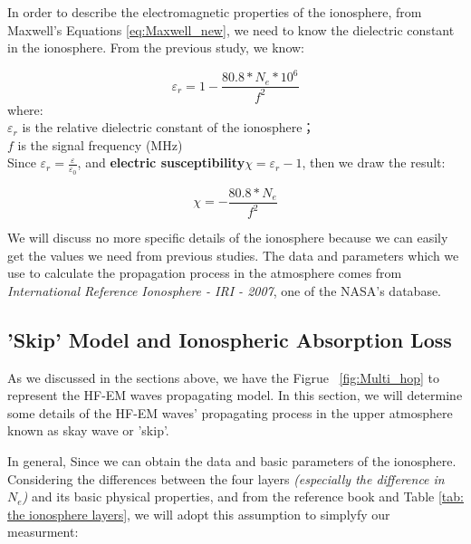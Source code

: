 \documentclass{mcmthesis}
\begin{document}
    In order to describe the electromagnetic properties of the ionosphere, from Maxwell's Equations \ref{eq:Maxwell_new}, we need to know the dielectric constant in the ionosphere. From the previous study\cite{davies1990ionospheric}, we know:

      \begin{equation}\label{eq:relative_dielectric}
        \varepsilon_{r} = 1 - \frac{80.8 * N_{e} * 10^{6}}{f^{2}}
      \end{equation}
      where:\\
      $\varepsilon_{r}$ is the relative dielectric constant of the ionosphere；\\
      $f$ is the signal frequency (MHz) \\

    Since $\varepsilon_{r} = \frac{\varepsilon}{\varepsilon_{0}}$, and \textbf{electric susceptibility}$\chi = \varepsilon_{r} - 1$, then we draw the result:

      \begin{equation}\label{eq:chi}
        \chi = - \frac{80.8 * N_{e}}{f^{2}}
      \end{equation}




    We will discuss no more specific details of the ionosphere because we can easily get the values we need from previous studies. The data and parameters which we use to calculate the propagation process in the atmosphere comes from \emph{International Reference Ionosphere - IRI - 2007}\cite{NASAIonosphere}, one of the NASA's database.


  \subsection{'Skip' Model and Ionospheric Absorption Loss}

    As we discussed in the sections above, we have the Figrue ~\ref{fig:Multi_hop} to represent the HF-EM waves propagating model. In this section, we will determine some details of the HF-EM waves' propagating process in the upper atmosphere known as skay wave or 'skip'.

    In general, Since we can obtain the data and basic parameters of the ionosphere. Considering the differences between the four layers \emph{(especially the difference in $N_{e}$)} and its basic physical properties, and from the reference book\cite{davies1990ionospheric,terman1943radio} and Table \ref{tab: the ionosphere layers}, we will adopt this assumption to simplyfy our measurment:
\end{document}
